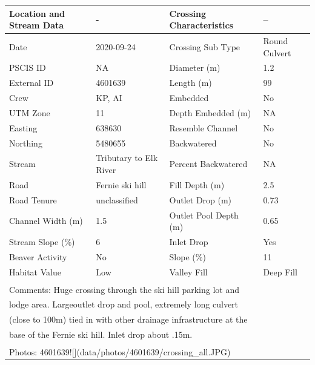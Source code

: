 \documentclass[
]{book}
\begin{document}
\begin{tabular}{l|l|l|l}
\hline
Location and Stream Data & - & Crossing Characteristics & --\\
\hline
Date & 2020-09-24 & Crossing Sub Type & Round Culvert\\
\hline
PSCIS ID & NA & Diameter (m) & 1.2\\
\hline
External ID & 4601639 & Length (m) & 99\\
\hline
Crew & KP, AI & Embedded & No\\
\hline
UTM Zone & 11 & Depth Embedded (m) & NA\\
\hline
Easting & 638630 & Resemble Channel & No\\
\hline
Northing & 5480655 & Backwatered & No\\
\hline
Stream & Tributary to Elk River & Percent Backwatered & NA\\
\hline
Road & Fernie ski hill & Fill Depth (m) & 2.5\\
\hline
Road Tenure & unclassified & Outlet Drop (m) & 0.73\\
\hline
Channel Width (m) & 1.5 & Outlet Pool Depth (m) & 0.65\\
\hline
Stream Slope (\%) & 6 & Inlet Drop & Yes\\
\hline
Beaver Activity & No & Slope (\%) & 11\\
\hline
Habitat Value & Low & Valley Fill & Deep Fill\\
\hline
\multicolumn{4}{l}{\textsuperscript{} Comments: Huge crossing through the ski hill parking lot and}\\
\multicolumn{4}{l}{lodge area.  Largeoutlet drop and pool, extremely long culvert}\\
\multicolumn{4}{l}{(close to 100m) tied in with other drainage infrastructure at the}\\
\multicolumn{4}{l}{base of the Fernie ski hill. Inlet drop about .15m.}\\
\multicolumn{4}{l}{\textsuperscript{} Photos: 4601639![](data/photos/4601639/crossing\_all.JPG)}\\
\end{tabular}
\end{document}
